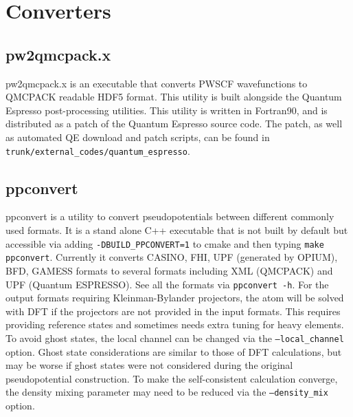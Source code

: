 \section{Converters} 
    
  \subsection{pw2qmcpack.x}
    pw2qmcpack.x is an executable that converts PWSCF wavefunctions to QMCPACK readable 
    HDF5 format.  This utility is built alongside the Quantum Espresso post-processing utilities.
    This utility is written in Fortran90, and is distributed as a patch of the Quantum Espresso 
    source code.  The patch, as well as automated QE download and patch scripts, can be found in 
    \texttt{trunk/external\_codes/quantum\_espresso}.
  \subsection{ppconvert}
    \label{sec:ppconvert}
    ppconvert is a utility to convert pseudopotentials between different commonly used formats.
    It is a stand alone C++ executable that is not built by default but accessible via adding
    \texttt{-DBUILD\_PPCONVERT=1} to cmake and then typing \texttt{make ppconvert}.
    Currently it converts CASINO, FHI, UPF (generated by OPIUM), BFD, GAMESS formats to several formats
    including XML (QMCPACK) and UPF (Quantum ESPRESSO). See all the formats via \texttt{ppconvert -h}.
    For the output formats requiring Kleinman-Bylander projectors, the atom will be solved with DFT
    if the projectors are not provided in the input formats.
    This requires providing reference states and sometimes needs extra tuning for heavy elements.
    To avoid ghost states, the local channel can be changed via the \texttt{--local\_channel} option. Ghost state considerations are similar to those of DFT calculations, but may be worse if ghost states were not considered during the original pseudopotential construction.
    To make the self-consistent calculation converge, the density mixing parameter may need to be reduced
    via the \texttt{--density\_mix} option.

